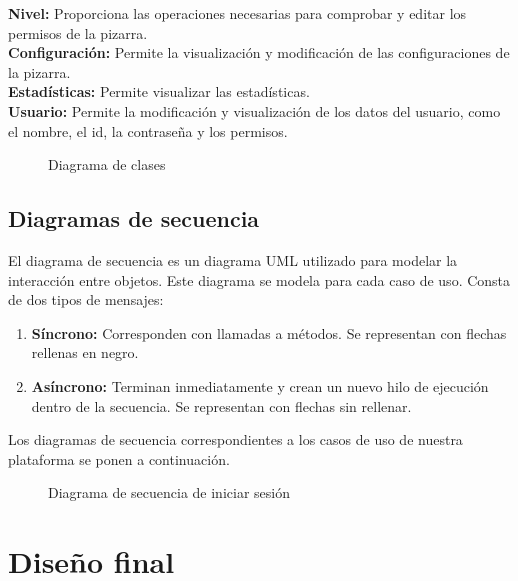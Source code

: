 \textbf{Nivel: }Proporciona las operaciones necesarias para comprobar y editar los permisos de la pizarra.\\

\textbf{Configuración: }Permite la visualización y modificación de las configuraciones de la pizarra.\\

\textbf{Estadísticas: }Permite visualizar las estadísticas.\\

\textbf{Usuario:} Permite la modificación y visualización de los datos del usuario, como el nombre, el id, la contraseña y los permisos.


\begin{sidewaysfigure}
\centering
\clases
\caption{Diagrama de clases}
\end{sidewaysfigure}





\subsection{Diagramas de secuencia}

El diagrama de secuencia es un diagrama UML utilizado para modelar la interacción entre objetos. Este diagrama se modela para cada caso de uso. Consta de dos tipos de mensajes:
\begin{enumerate}
	\item \textbf{Síncrono: }Corresponden con llamadas a métodos. Se representan con flechas rellenas en negro.
	\item \textbf{Asíncrono: }Terminan inmediatamente y crean un nuevo hilo de ejecución dentro de la secuencia. Se representan con flechas sin rellenar.
\end{enumerate}

Los diagramas de secuencia correspondientes a los casos de uso de nuestra plataforma se ponen a continuación.

\begin{figure}[!h]
\centering
\seqIniciarSesion
\caption{Diagrama de secuencia de iniciar sesión}
\end{figure}

\section{Diseño final}